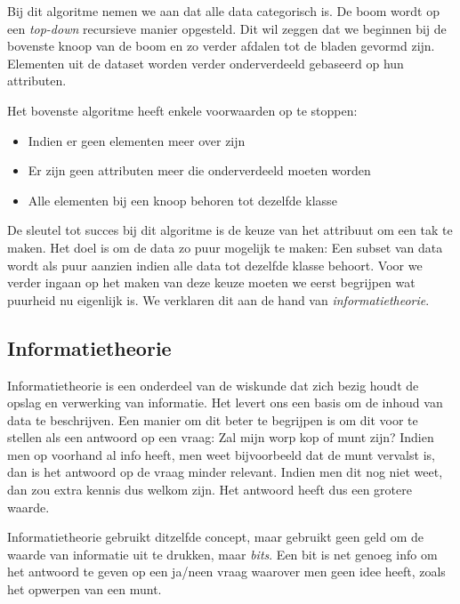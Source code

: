 Bij dit algoritme nemen we aan dat alle data categorisch is. De boom wordt op een \emph{top-down} recursieve manier opgesteld. Dit wil zeggen dat we beginnen bij de bovenste knoop van de boom en zo verder afdalen tot de bladen gevormd zijn. Elementen uit de dataset worden verder onderverdeeld gebaseerd op hun attributen.

Het bovenste algoritme heeft enkele voorwaarden op te stoppen:

\begin{itemize}
\item Indien er geen elementen meer over zijn
\item Er zijn geen attributen meer die onderverdeeld moeten worden
\item Alle elementen bij een knoop behoren tot dezelfde klasse
\end{itemize}

De sleutel tot succes bij dit algoritme is de keuze van het attribuut om een tak te maken. Het doel is om de data zo puur mogelijk te maken: Een subset van data wordt als puur aanzien indien alle data tot dezelfde klasse behoort. Voor we verder ingaan op het maken van deze keuze moeten we eerst begrijpen wat puurheid nu eigenlijk is. We verklaren dit aan de hand van \emph{informatietheorie}.

\subsection{Informatietheorie}
Informatietheorie is een onderdeel van de wiskunde dat zich bezig houdt de opslag en verwerking van informatie. Het levert ons een basis om de inhoud van data te beschrijven. Een manier om dit beter te begrijpen is om dit voor te stellen als een antwoord op een vraag: Zal mijn worp kop of munt zijn? Indien men op voorhand al info heeft, men weet bijvoorbeeld dat de munt vervalst is, dan is het antwoord op de vraag minder relevant. Indien men dit nog niet weet, dan zou extra kennis dus welkom zijn. Het antwoord heeft dus een grotere waarde.

Informatietheorie gebruikt ditzelfde concept, maar gebruikt geen geld om de waarde van informatie uit te drukken, maar \emph{bits}. Een bit is net genoeg info om het antwoord te geven op een ja/neen vraag waarover men geen idee heeft, zoals het opwerpen van een munt.


